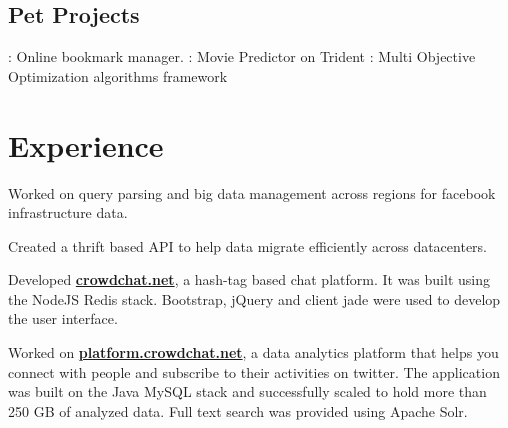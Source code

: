 \documentclass[]{bigfatnoob-resume}
\begin{document}
\begin{minipage}[t]{0.33\textwidth}
\subsection{Pet Projects}
\href{http://region.io}{}: Online bookmark manager.
\href{https://github.com/NCSU-Advanced-Algos/octorater}{}: Movie Predictor on Trident
\href{https://github.com/bigfatnoob/optima}{}: Multi Objective Optimization algorithms framework

%
%

\end{minipage} 
\hfill
\begin{minipage}[t]{0.66\textwidth} 


\section{Experience}

\vspace{\topsep} %
\begin{tightemize}
\item Worked on query parsing and big data management across regions for facebook infrastructure data.
\item Created a thrift based API to help data migrate efficiently across datacenters.
\end{tightemize}
\sectionsep

\begin{tightemize}
\item Developed \textbf{\href{https://www.crowdchat.net/}{crowdchat.net}}, a hash-tag based chat platform. It was built using the NodeJS Redis stack. Bootstrap, jQuery and client jade were used to develop the user interface.
\item Worked on \textbf{\href{https://platform.crowdchat.net}{platform.crowdchat.net}}, a data analytics platform that helps you connect with people and subscribe to their activities on twitter. The application was built on the Java MySQL stack and successfully scaled to hold more than 250 GB of analyzed data. Full text search was provided using Apache Solr.\end{tightemize}
\sectionsep


\end{minipage}
\end{document}
